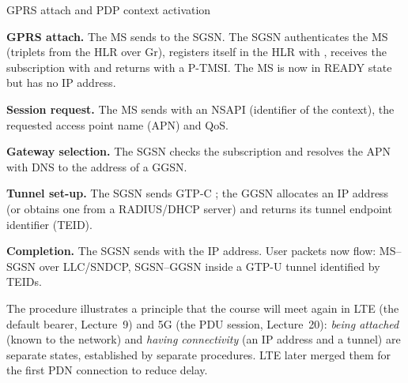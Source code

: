 \documentclass[11pt,a4paper]{article}
\begin{document}
\begin{acnfigure}
  \caption{Message sequence of GSM authentication and ciphering (\cref{proc:auth}).}
  \label{fig:auth}
\end{acnfigure}

\begin{procedurebox}{GPRS attach and PDP context activation}\label{proc:pdp}
\begin{steps}
  \item \textbf{GPRS attach.} The MS sends  to the SGSN. The SGSN
        authenticates the MS (triplets from the HLR over Gr), registers itself in the
        HLR with , receives the subscription with
         and returns  with a P-TMSI.
        The MS is now in READY state but has no IP address.
  \item \textbf{Session request.} The MS sends 
        with an NSAPI (identifier of the context), the requested access point name
        (APN) and QoS.
  \item \textbf{Gateway selection.} The SGSN checks the subscription and resolves the
        APN with DNS to the address of a GGSN.
  \item \textbf{Tunnel set-up.} The SGSN sends GTP-C ;
        the GGSN allocates an IP address (or obtains one from a RADIUS/DHCP server)
        and returns its tunnel endpoint identifier (TEID).
  \item \textbf{Completion.} The SGSN sends  with the
        IP address. User packets now flow: MS--SGSN over LLC/SNDCP, SGSN--GGSN inside a
        GTP-U tunnel identified by TEIDs.
\end{steps}
\end{procedurebox}

\begin{acnfigure}
  \caption{GPRS attach followed by PDP context activation (\cref{proc:pdp}).
  Dashed blue: signalling; solid teal: user plane.}
  \label{fig:pdp}
\end{acnfigure}

The procedure illustrates a principle that the course will meet again in LTE (the
default bearer, Lecture~9) and 5G (the PDU session, Lecture~20): \emph{being
attached} (known to the network) and \emph{having connectivity} (an IP address and a
tunnel) are separate states, established by separate procedures. LTE later merged
them for the first PDN connection to reduce delay.
\end{document}
